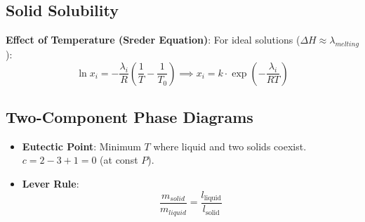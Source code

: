 \subsection{Solid Solubility}
\textbf{Effect of Temperature (Sreder Equation)}:
For ideal solutions ($\Delta H \approx \lambda_{melting}$):
\begin{equation}
    \ln x_i = -\frac{\lambda_i}{R} \left( \frac{1}{T} - \frac{1}{T_0} \right) \implies x_i = k \cdot \exp\left(-\frac{\lambda_i}{RT}\right)
\end{equation}

\subsection{Two-Component Phase Diagrams}
\begin{itemize}
    \item \textbf{Eutectic Point}: Minimum $T$ where liquid and two solids coexist. $c = 2 - 3 + 1 = 0$ (at const $P$).
    \item \textbf{Lever Rule}: 
    \begin{equation}
        \frac{m_{solid}}{m_{liquid}} = \frac{l_{\text{liquid}}}{l_{\text{solid}}}
    \end{equation}
\end{itemize}
\vspace{0.2cm}

